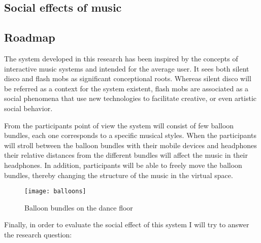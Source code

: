 \subsection{Social effects of music}


\subsection{Roadmap}\label{roadmap}


The system developed in this research has been inspired by the concepts of interactive music systems and intended for the average user. It sees both silent disco and flash mobs as significant conceptional roots. Whereas silent disco will be referred as a context for the system existent, flash mobs are associated as a social phenomena that use new technologies to facilitate creative, or even artistic social behavior.

From the participants point of view the system will consist of few balloon bundles, each one corresponds to a specific musical styles. When the participants will stroll between the balloon bundles with their mobile devices and headphones their relative distances from the different bundles will affect the music in their headphones. In addition, participants will be able to freely move the balloon bundles, thereby changing the structure of the music in the virtual space.

\begin{figure}[h]
	\texttt{[image: balloons]}
	\caption{Balloon bundles on the dance floor}
\end{figure}

Finally, in order to evaluate the social effect of this system I will try to answer the research question: \emph{\reserchquestion}